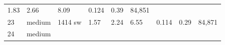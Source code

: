\documentclass[
  10pt, ]{article}
\begin{document}
\begin{longtable}[]{@{}lllllllll@{}}
\begin{minipage}[t]{0.08\columnwidth}
1.83\strut
\end{minipage} & \begin{minipage}[t]{0.08\columnwidth}\raggedright
2.66\strut
\end{minipage} & \begin{minipage}[t]{0.08\columnwidth}\raggedright
8.09\strut
\end{minipage} & \begin{minipage}[t]{0.08\columnwidth}\raggedright
0.124\strut
\end{minipage} & \begin{minipage}[t]{0.08\columnwidth}\raggedright
0.39\strut
\end{minipage} & \begin{minipage}[t]{0.08\columnwidth}\raggedright
84,851\strut
\end{minipage}\tabularnewline
\begin{minipage}[t]{0.08\columnwidth}\raggedright
23\strut
\end{minipage} & \begin{minipage}[t]{0.08\columnwidth}\raggedright
medium\strut
\end{minipage} & \begin{minipage}[t]{0.08\columnwidth}\raggedright
1414 sw\strut
\end{minipage} & \begin{minipage}[t]{0.08\columnwidth}\raggedright
1.57\strut
\end{minipage} & \begin{minipage}[t]{0.08\columnwidth}\raggedright
2.24\strut
\end{minipage} & \begin{minipage}[t]{0.08\columnwidth}\raggedright
6.55\strut
\end{minipage} & \begin{minipage}[t]{0.08\columnwidth}\raggedright
0.114\strut
\end{minipage} & \begin{minipage}[t]{0.08\columnwidth}\raggedright
0.29\strut
\end{minipage} & \begin{minipage}[t]{0.08\columnwidth}\raggedright
84,871\strut
\end{minipage}\tabularnewline
\begin{minipage}[t]{0.08\columnwidth}\raggedright
24\strut
\end{minipage} & \begin{minipage}[t]{0.08\columnwidth}\raggedright
medium\strut
\end{minipage} & \begin{minipage}[t]{0.08\columnwidth}\raggedright

\end{minipage}
\end{longtable}
\end{document}

